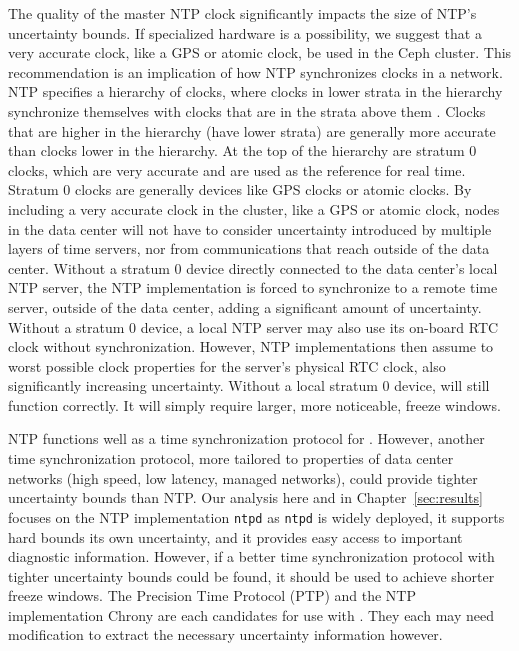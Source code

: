 The quality of the master NTP clock significantly impacts the size of
NTP's uncertainty bounds. If specialized hardware is a possibility, we 
suggest that a very accurate clock, like
a GPS or atomic clock, be used in the Ceph cluster. This
recommendation is an implication of how NTP synchronizes clocks in a
network. NTP specifies a hierarchy of clocks, where clocks in lower strata
in the hierarchy synchronize themselves with clocks that are in the
strata above them \citep{Burbank2010}. Clocks that are higher in the 
hierarchy (have lower strata) are
generally more accurate than clocks lower in the hierarchy. At the top
of the hierarchy are stratum 0 clocks, which are very accurate and are
used as the reference for real time. Stratum 0 clocks are generally 
devices like GPS clocks or atomic clocks. By including a very accurate
clock in the cluster, like a GPS or atomic clock, nodes in the data center
will not have to consider uncertainty introduced by multiple layers 
of time servers, nor from communications that reach outside of the
data center. Without a stratum 0 device directly connected to the 
data center's local NTP server, the NTP implementation is forced to synchronize
to a remote time server, outside of the data center, adding a significant
amount of uncertainty. Without a stratum 0 device, a local NTP server
may also use its on-board RTC clock without synchronization. However, 
NTP implementations then assume to worst possible clock
properties for the server's physical RTC clock, also significantly 
increasing uncertainty. Without a local stratum 0 device, \alg will
still function correctly. It will simply require larger, more noticeable,
freeze windows. 

NTP functions well as a time synchronization protocol for \alg.  
However, another time synchronization protocol, more
tailored to properties of data center networks 
(high speed, low latency, managed networks), 
could provide tighter uncertainty
bounds than NTP. Our analysis here and in Chapter~\ref{sec:results} 
focuses on the NTP implementation \texttt{ntpd} as \texttt{ntpd} is widely
deployed, it supports hard bounds its own uncertainty, and it 
provides easy access to important
diagnostic information. However, if a better time synchronization
protocol with tighter uncertainty bounds could be found, it should be
used to achieve shorter freeze windows. The Precision Time Protocol (PTP)
and the NTP implementation Chrony are each candidates for use with \alg. 
They each may need modification to extract the
necessary uncertainty information however.
